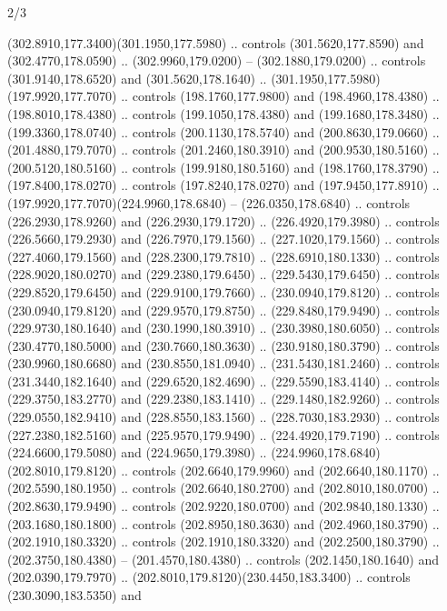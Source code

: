 \begin{flagdescription}{2/3}
\begin{scope}[xshift=0.5\flaglength,yshift=0.5\flagwidth,scale=\flagwidth/259.2]
\begin{scope}[y=0.8pt, x=0.8pt, yscale=-1,shift={(-243,-162)}]
      (302.8910,177.3400)(301.1950,177.5980) .. controls (301.5620,177.8590) and
      (302.4770,178.0590) .. (302.9960,179.0200) -- (302.1880,179.0200) .. controls
      (301.9140,178.6520) and (301.5620,178.1640) ..
      (301.1950,177.5980)(197.9920,177.7070) .. controls (198.1760,177.9800) and
      (198.4960,178.4380) .. (198.8010,178.4380) .. controls (199.1050,178.4380) and
      (199.1680,178.3480) .. (199.3360,178.0740) .. controls (200.1130,178.5740) and
      (200.8630,179.0660) .. (201.4880,179.7070) .. controls (201.2460,180.3910) and
      (200.9530,180.5160) .. (200.5120,180.5160) .. controls (199.9180,180.5160) and
      (198.1760,178.3790) .. (197.8400,178.0270) .. controls (197.8240,178.0270) and
      (197.9450,177.8910) .. (197.9920,177.7070)(224.9960,178.6840) --
      (226.0350,178.6840) .. controls (226.2930,178.9260) and (226.2930,179.1720) ..
      (226.4920,179.3980) .. controls (226.5660,179.2930) and (226.7970,179.1560) ..
      (227.1020,179.1560) .. controls (227.4060,179.1560) and (228.2300,179.7810) ..
      (228.6910,180.1330) .. controls (228.9020,180.0270) and (229.2380,179.6450) ..
      (229.5430,179.6450) .. controls (229.8520,179.6450) and (229.9100,179.7660) ..
      (230.0940,179.8120) .. controls (230.0940,179.8120) and (229.9570,179.8750) ..
      (229.8480,179.9490) .. controls (229.9730,180.1640) and (230.1990,180.3910) ..
      (230.3980,180.6050) .. controls (230.4770,180.5000) and (230.7660,180.3630) ..
      (230.9180,180.3790) .. controls (230.9960,180.6680) and (230.8550,181.0940) ..
      (231.5430,181.2460) .. controls (231.3440,182.1640) and (229.6520,182.4690) ..
      (229.5590,183.4140) .. controls (229.3750,183.2770) and (229.2380,183.1410) ..
      (229.1480,182.9260) .. controls (229.0550,182.9410) and (228.8550,183.1560) ..
      (228.7030,183.2930) .. controls (227.2380,182.5160) and (225.9570,179.9490) ..
      (224.4920,179.7190) .. controls (224.6600,179.5080) and (224.9650,179.3980) ..
      (224.9960,178.6840)(202.8010,179.8120) .. controls (202.6640,179.9960) and
      (202.6640,180.1170) .. (202.5590,180.1950) .. controls (202.6640,180.2700) and
      (202.8010,180.0700) .. (202.8630,179.9490) .. controls (202.9220,180.0700) and
      (202.9840,180.1330) .. (203.1680,180.1800) .. controls (202.8950,180.3630) and
      (202.4960,180.3790) .. (202.1910,180.3320) .. controls (202.1910,180.3320) and
      (202.2500,180.3790) .. (202.3750,180.4380) -- (201.4570,180.4380) .. controls
      (202.1450,180.1640) and (202.0390,179.7970) ..
      (202.8010,179.8120)(230.4450,183.3400) .. controls (230.3090,183.5350) and

\end{scope}
\end{scope}
\end{flagdescription}
